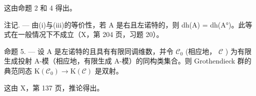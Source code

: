 这由命题 2 和 4 得出。

注记. --- 由(i)与(iii)的等价性，若 A 是右且左诺特的，则 dh(A) = dh(A°)。此等式在一般情况下不成立（X，第 204 页，习题 20）。

命题 5. --- 设 A 是左诺特的且具有有限同调维数，并令 \(\mathcal{C}_{0}\) (相应地， \(\mathcal{C}\) ) 为有限生成投射 A-模（相应地，有限生成 A-模）的同构类集合。则 Grothendieck 群的典范同态 \(\mathrm{K}(\mathcal{C}_{0}) \to \mathrm{K}(\mathcal{C})\) 是双射。

这由 X，第 137 页，推论得出。

